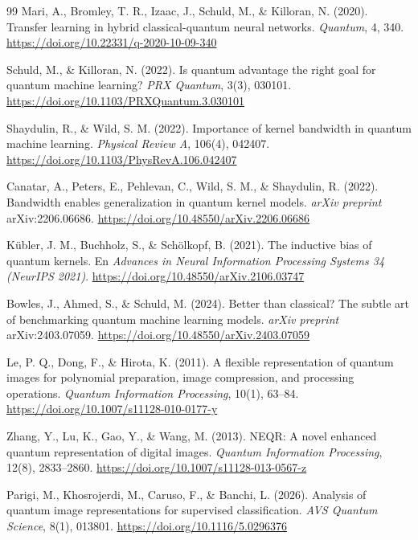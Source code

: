 \begin{thebibliography}{99}
    Mari, A., Bromley, T. R., Izaac, J., Schuld, M., \& Killoran, N. (2020).
    Transfer learning in hybrid classical-quantum neural networks.
    \textit{Quantum}, 4, 340.
    \url{https://doi.org/10.22331/q-2020-10-09-340}

    Schuld, M., \& Killoran, N. (2022).
    Is quantum advantage the right goal for quantum machine learning?
    \textit{PRX Quantum}, 3(3), 030101.
    \url{https://doi.org/10.1103/PRXQuantum.3.030101}

    Shaydulin, R., \& Wild, S. M. (2022).
    Importance of kernel bandwidth in quantum machine learning.
    \textit{Physical Review A}, 106(4), 042407.
    \url{https://doi.org/10.1103/PhysRevA.106.042407}

    Canatar, A., Peters, E., Pehlevan, C., Wild, S. M., \& Shaydulin, R. (2022).
    Bandwidth enables generalization in quantum kernel models.
    \textit{arXiv preprint} arXiv:2206.06686.
    \url{https://doi.org/10.48550/arXiv.2206.06686}

    K\"ubler, J. M., Buchholz, S., \& Sch\"olkopf, B. (2021).
    The inductive bias of quantum kernels.
    En \textit{Advances in Neural Information Processing Systems 34 (NeurIPS 2021)}.
    \url{https://doi.org/10.48550/arXiv.2106.03747}

    Bowles, J., Ahmed, S., \& Schuld, M. (2024).
    Better than classical? The subtle art of benchmarking quantum machine learning models.
    \textit{arXiv preprint} arXiv:2403.07059.
    \url{https://doi.org/10.48550/arXiv.2403.07059}

    Le, P. Q., Dong, F., \& Hirota, K. (2011).
    A flexible representation of quantum images for polynomial preparation, image compression, and processing operations.
    \textit{Quantum Information Processing}, 10(1), 63--84.
    \url{https://doi.org/10.1007/s11128-010-0177-y}

    Zhang, Y., Lu, K., Gao, Y., \& Wang, M. (2013).
    NEQR: A novel enhanced quantum representation of digital images.
    \textit{Quantum Information Processing}, 12(8), 2833--2860.
    \url{https://doi.org/10.1007/s11128-013-0567-z}

    Parigi, M., Khosrojerdi, M., Caruso, F., \& Banchi, L. (2026).
    Analysis of quantum image representations for supervised classification.
    \textit{AVS Quantum Science}, 8(1), 013801.
    \url{https://doi.org/10.1116/5.0296376}



\end{thebibliography}
